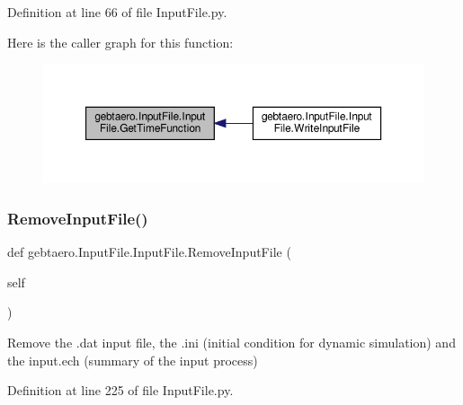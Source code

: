Definition at line 66 of file Input\+File.\+py.

Here is the caller graph for this function\+:\nopagebreak
\begin{figure}[H]
\begin{center}
\leavevmode
\includegraphics[width=350pt]{classgebtaero_1_1_input_file_1_1_input_file_a5d53bb9ae864d002dfbbee1231b91881_icgraph}
\end{center}
\end{figure}
\mbox{\label{classgebtaero_1_1_input_file_1_1_input_file_a5c0e5660a7e8a816f2fe3b712480306a}} 
\subsubsection{\texorpdfstring{Remove\+Input\+File()}{RemoveInputFile()}}
{\footnotesize\ttfamily def gebtaero.\+Input\+File.\+Input\+File.\+Remove\+Input\+File (\begin{DoxyParamCaption}\item[{}]{self }\end{DoxyParamCaption})}



Remove the .dat input file, the .ini (initial condition for dynamic simulation) and the input.\+ech (summary of the input process) 



Definition at line 225 of file Input\+File.\+py.

\mbox{\label{classgebtaero_1_1_input_file_1_1_input_file_a0138cdf368f06be59a355955c737a3c3}} 
